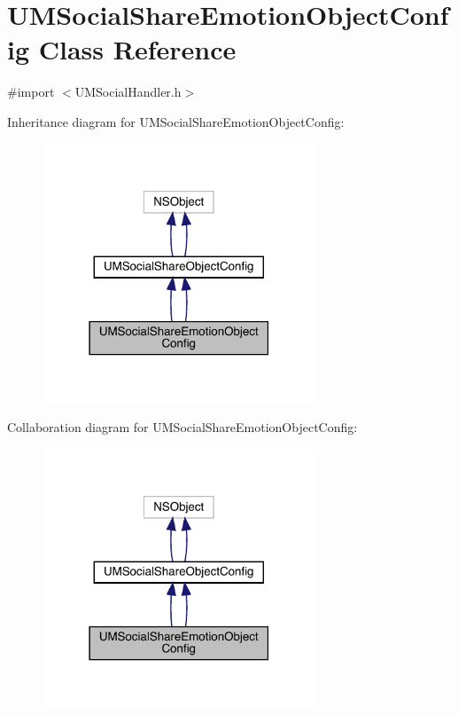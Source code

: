 \hypertarget{interface_u_m_social_share_emotion_object_config}{}\section{U\+M\+Social\+Share\+Emotion\+Object\+Config Class Reference}
\label{interface_u_m_social_share_emotion_object_config}


{\ttfamily \#import $<$U\+M\+Social\+Handler.\+h$>$}



Inheritance diagram for U\+M\+Social\+Share\+Emotion\+Object\+Config\+:\nopagebreak
\begin{figure}[H]
\begin{center}
\leavevmode
\includegraphics[width=231pt]{interface_u_m_social_share_emotion_object_config__inherit__graph}
\end{center}
\end{figure}


Collaboration diagram for U\+M\+Social\+Share\+Emotion\+Object\+Config\+:\nopagebreak
\begin{figure}[H]
\begin{center}
\leavevmode
\includegraphics[width=231pt]{interface_u_m_social_share_emotion_object_config__coll__graph}
\end{center}
\end{figure}
